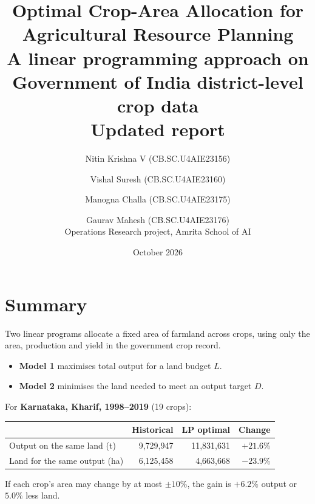 \documentclass[11pt,a4paper]{article}
\title{Optimal Crop-Area Allocation for Agricultural Resource Planning\\[4pt]
\large A linear programming approach on Government of India district-level crop data\\[2pt]
\normalsize Updated report}
\author{Nitin Krishna V (CB.SC.U4AIE23156) \and Vishal Suresh (CB.SC.U4AIE23160) \and
Manogna Challa (CB.SC.U4AIE23175) \and Gaurav Mahesh (CB.SC.U4AIE23176)\\[4pt]
Operations Research project, Amrita School of AI}
\date{October 2026}
\begin{document}
\maketitle

\section*{Summary}
Two linear programs allocate a fixed area of farmland across crops, using only the area,
production and yield in the government crop record.
\begin{itemize}
  \item \textbf{Model 1} maximises total output for a land budget $L$.
  \item \textbf{Model 2} minimises the land needed to meet an output target $D$.
\end{itemize}

For \textbf{Karnataka, Kharif, 1998--2019} (19 crops):

\begin{center}
\begin{tabular}{lrrr}
\toprule
 & Historical & LP optimal & Change \\
\midrule
Output on the same land (t)   & 9,729,947 & 11,831,631 & $+21.6\%$ \\
Land for the same output (ha) & 6,125,458 & 4,663,668  & $-23.9\%$ \\
\bottomrule
\end{tabular}
\end{center}

If each crop's area may change by at most $\pm10\%$, the gain is $+6.2\%$ output or $5.0\%$ less land.
\end{document}
